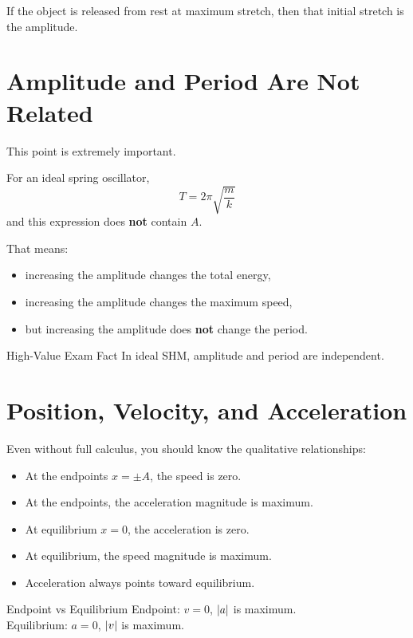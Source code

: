 If the object is released from rest at maximum stretch, then that initial stretch is the amplitude.

\section{Amplitude and Period Are Not Related}
This point is extremely important.

For an ideal spring oscillator,
\begin{equation}
    T = 2\pi\sqrt{\frac{m}{k}}
\end{equation}
and this expression does \textbf{not} contain $A$.

That means:
\begin{itemize}
    \item increasing the amplitude changes the total energy,
    \item increasing the amplitude changes the maximum speed,
    \item but increasing the amplitude does \textbf{not} change the period.
\end{itemize}

\begin{keyidea}{High-Value Exam Fact}
In ideal SHM, amplitude and period are independent.
\end{keyidea}

\section{Position, Velocity, and Acceleration}
Even without full calculus, you should know the qualitative relationships:
\begin{itemize}
    \item At the endpoints $x=\pm A$, the speed is zero.
    \item At the endpoints, the acceleration magnitude is maximum.
    \item At equilibrium $x=0$, the acceleration is zero.
    \item At equilibrium, the speed magnitude is maximum.
    \item Acceleration always points toward equilibrium.
\end{itemize}

\begin{keyidea}{Endpoint vs Equilibrium}
Endpoint: $v=0$, $\left|a\right|$ is maximum.\\
Equilibrium: $a=0$, $\left|v\right|$ is maximum.
\end{keyidea}

